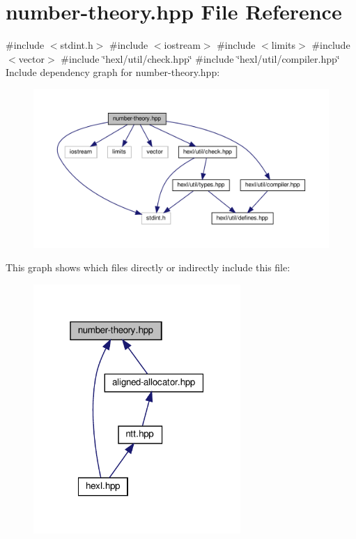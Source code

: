\hypertarget{number-theory_8hpp}{}\section{number-\/theory.hpp File Reference}
\label{number-theory_8hpp}
{\ttfamily \#include $<$stdint.\+h$>$}\newline
{\ttfamily \#include $<$iostream$>$}\newline
{\ttfamily \#include $<$limits$>$}\newline
{\ttfamily \#include $<$vector$>$}\newline
{\ttfamily \#include \char`\"{}hexl/util/check.\+hpp\char`\"{}}\newline
{\ttfamily \#include \char`\"{}hexl/util/compiler.\+hpp\char`\"{}}\newline
Include dependency graph for number-\/theory.hpp\+:
\nopagebreak
\begin{figure}[H]
\begin{center}
\leavevmode
\includegraphics[width=350pt]{number-theory_8hpp__incl}
\end{center}
\end{figure}
This graph shows which files directly or indirectly include this file\+:
\nopagebreak
\begin{figure}[H]
\begin{center}
\leavevmode
\includegraphics[width=223pt]{number-theory_8hpp__dep__incl}
\end{center}
\end{figure}
